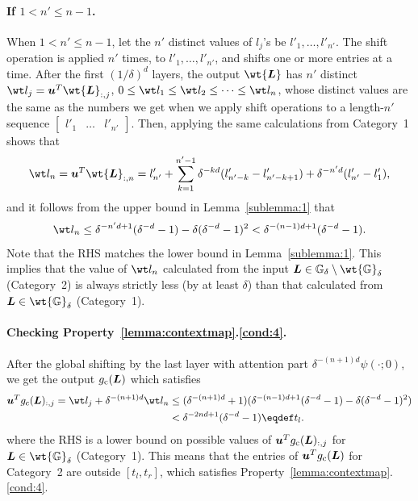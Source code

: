 \documentclass{article} %
\def\vu{{\bm{u}}}
\def\mL{{\bm{L}}}
\def\sG{{\mathbb{G}}}
\begin{document}
\paragraph{If $1 < n' \leq n - 1$.}
When $1 < n' \leq n-1$, let the $n'$ distinct values of $l_j$'s be $l'_1, \dots, l'_{n'}$.
The shift operation is applied $n'$ times, to $l'_1, \dots, l'_{n'}$, and shifts one or more entries at a time. After the first $(1/\delta)^d$ layers, the output $\wt \mL$ has $n'$ distinct $\wt l_j = \vu^T \wt \mL_{:,j}$, $0 \leq \wt l_1 \leq \wt l_2 \leq \dots \leq \wt l_n$, whose distinct values are the same as the numbers we get when we apply shift operations to a length-$n'$ sequence $\begin{bmatrix} l'_1 & \dots & l'_{n'} \end{bmatrix}$.
Then, applying the same calculations from Category~1 shows that
\begin{equation*}
    \wt l_n = 
    \vu^T \wt \mL_{:,n}
    =
    l'_{n'} + \sum_{k=1}^{n'-1} \delta^{-kd}(l'_{n'-k}-l'_{n'-k+1}) + \delta^{-n'd} (l'_{n'}-l'_1),
\end{equation*}
and it follows from the upper bound in Lemma~\ref{sublemma:1} that
\begin{equation*}
    \wt l_n
    \leq \delta^{-n'd + 1}(\delta^{-d}-1) - \delta (\delta^{-d} - 1)^2
    < \delta^{-(n-1)d + 1}(\delta^{-d}-1).
\end{equation*}
Note that the RHS matches the lower bound in Lemma~\ref{sublemma:1}.
This implies that the value of $\wt l_n$ calculated from the input $\mL \in \sG_{\delta}\setminus \wt {\sG}_{\delta}$ (Category~2) is always strictly less (by at least $\delta$) than that calculated from $\mL \in \wt {\sG}_{\delta}$ (Category~1).

\paragraph{Checking Property~\ref{lemma:contextmap}.\ref{cond:4}.}
After the global shifting by the last layer with attention part $\delta^{-(n+1)d} \psi(\cdot;0)$, we get the output $g_{\rm c}(\mL)$ which satisfies
\begin{align*}
    \vu^T g_{\rm c}(\mL)_{:,j} = \wt l_{j} + \delta^{-(n+1)d} \wt l_n
    &\leq (\delta^{-(n+1)d} + 1) (\delta^{-(n-1)d + 1}(\delta^{-d}-1) - \delta (\delta^{-d} - 1)^2)\\
    &< \delta^{-2nd+1}(\delta^{-d}-1) \eqdef t_l.
\end{align*}
where the RHS is a lower bound on possible values of $\vu^T g_{\rm c}(\mL)_{:,j}$ for $\mL \in \wt {\sG}_{\delta}$ (Category~1).
This means that the entries of $\vu^T g_{\rm c}(\mL)$ for Category~2 are outside $[t_l, t_r]$, which satisfies Property~\ref{lemma:contextmap}.\ref{cond:4}.
\end{document}
